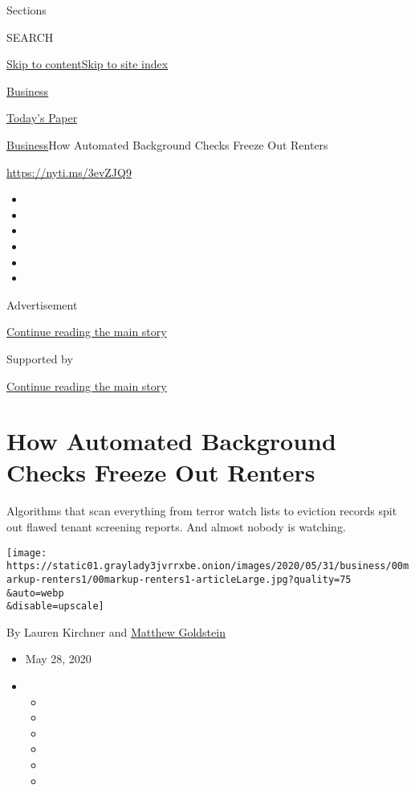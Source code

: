 Sections

SEARCH

\protect\hyperlink{site-content}{Skip to
content}\protect\hyperlink{site-index}{Skip to site index}

\href{https://www.nytimes3xbfgragh.onion/section/business}{Business}

\href{https://myaccount.nytimes3xbfgragh.onion/auth/login?response_type=cookie\&client_id=vi}{}

\href{https://www.nytimes3xbfgragh.onion/section/todayspaper}{Today's
Paper}

\href{/section/business}{Business}\textbar{}How Automated Background
Checks Freeze Out Renters

\url{https://nyti.ms/3evZJQ9}

\begin{itemize}
\item
\item
\item
\item
\item
\item
\end{itemize}

Advertisement

\protect\hyperlink{after-top}{Continue reading the main story}

Supported by

\protect\hyperlink{after-sponsor}{Continue reading the main story}

\hypertarget{how-automated-background-checks-freeze-out-renters}{%
\section{How Automated Background Checks Freeze Out
Renters}\label{how-automated-background-checks-freeze-out-renters}}

Algorithms that scan everything from terror watch lists to eviction
records spit out flawed tenant screening reports. And almost nobody is
watching.

\texttt{[image: https://static01.graylady3jvrrxbe.onion/images/2020/05/31/business/00markup-renters1/00markup-renters1-articleLarge.jpg?quality=75\\\&auto=webp\\\&disable=upscale]}

By Lauren Kirchner and
\href{https://www.nytimes3xbfgragh.onion/by/matthew-goldstein}{Matthew
Goldstein}

\begin{itemize}
\item
  May 28, 2020
\item
  \begin{itemize}
  \item
  \item
  \item
  \item
  \item
  \item
  \end{itemize}
\end{itemize}

